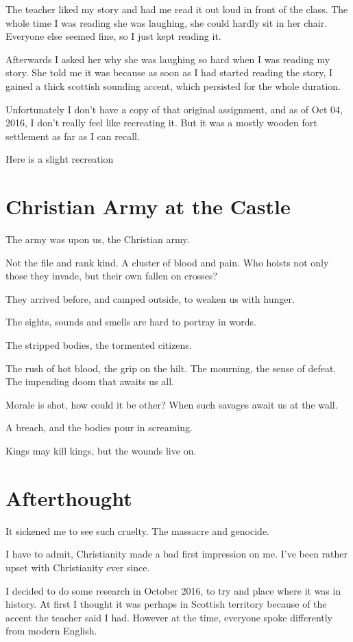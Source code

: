 The teacher liked my story and had me read it out loud in front of the class.
The whole time I was reading she was laughing, she could hardly sit in her
chair. Everyone else seemed fine, so I just kept reading it. 

Afterwards I asked her why she was laughing so hard when I was reading my story. 
She told me it was because as soon as I had started reading the story, I gained
a thick scottish sounding accent, which persisted for the whole duration. 

Unfortunately I don't have a copy of that original assignment, and as of Oct
04, 2016, I don't really feel like recreating it. But it was a mostly wooden 
fort settlement as far as I can recall. 

Here is a slight recreation

\section{Christian Army at the Castle}
The army was upon us, the Christian army.

Not the file and rank kind. A cluster of blood and pain. 
Who hoists not only those they invade, but their own fallen on crosses?

They arrived before, and camped outside, to weaken us with hunger. 

The sights, sounds and smells are hard to portray in words. 

The stripped bodies, the tormented citizens. 

The rush of hot blood, the grip on the hilt. The mourning, the sense of defeat. 
The impending doom that awaits us all. 

Morale is shot, how could it be other? When such savages await us at the wall.

A breach, and the bodies pour in screaming. 

Kings may kill kings, but the wounds live on. 
\section{Afterthought}

It sickened me to see such cruelty. The massacre and genocide. 

I have to admit, Christianity made a bad first impression on me. 
I've been rather upset with Christianity ever since. 

I decided to do some research in October 2016, to try and place where it was in
history. At first I thought it was perhaps in Scottish territory because of the
accent the teacher said I had. However at the time, everyone spoke differently
from modern English. 

